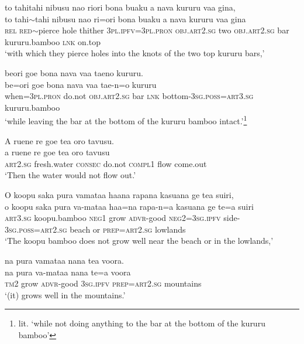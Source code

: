 \ea\label{ex:text6-27}
to tahitahi nibusu nao riori bona buaku a nava kururu vaa gina,\\
\gll to	tahi{$\sim$}tahi	nibusu	nao	ri=ori	bona	buaku	a	nava	kururu	vaa	gina\\
     \textsc{rel}	\textsc{red}{$\sim$}pierce	hole	thither	3\textsc{pl}.\textsc{ipfv}=3\textsc{pl}.\textsc{pron}	\textsc{obj}.\textsc{art}2.\textsc{sg}	two	\textsc{obj}.\textsc{art}2.\textsc{sg}	bar	kururu.bamboo	\textsc{lnk}	on.top\\
\glt `with which they pierce holes into the knots of the two top kururu bars,'
\z

\ea\label{ex:text6-28}
beori goe bona nava vaa taeno kururu.\\
\gll be=ori	goe	bona	nava	vaa	tae-n=o	kururu\\
     when=3\textsc{pl}.\textsc{pron}	do.not	\textsc{obj}.\textsc{art}2.\textsc{sg}	bar	\textsc{lnk}	bottom-3\textsc{sg}.\textsc{poss}=\textsc{art}3.\textsc{sg}	kururu.bamboo\\
\glt `while leaving the bar at the bottom of the kururu bamboo intact.'\footnote{lit. `while not doing anything to the bar at the bottom of the kururu bamboo'}
\z

\ea\label{ex:text6-29}
A ruene re goe tea oro tavusu.\\
\gll a	ruene	re	goe	tea	oro	tavusu\\
     \textsc{art}2.\textsc{sg}	fresh.water	\textsc{consec}	do.not	\textsc{compl}1	flow	come.out\\
\glt `Then the water would not flow out.'
\z

\ea\label{ex:text6-30}
O koopu saka pura vamataa haana rapana kasuana ge tea suiri,\\
\gll o	koopu	saka	pura	va-mataa	haa=na	rapa-n=a	kasuana	ge	te=a	suiri\\
     \textsc{art}3.\textsc{sg}	koopu.bamboo	\textsc{neg}1	grow	\textsc{advr}-good	\textsc{neg}2=3\textsc{sg}.\textsc{ipfv}	side-3\textsc{sg}.\textsc{poss}=\textsc{art}2.\textsc{sg}	beach	or	\textsc{prep}=\textsc{art}2.\textsc{sg}	lowlands\\
\glt `The koopu bamboo does not grow well near the beach or in the lowlands,'
\z

\ea\label{ex:text6-31}
na pura vamataa nana tea voora.\\
\gll na	pura	va-mataa	nana	te=a	voora\\
     \textsc{tm}2	grow	\textsc{advr}-good	3\textsc{sg}.\textsc{ipfv}	\textsc{prep}=\textsc{art}2.\textsc{sg}	mountains\\
\glt `(it) grows well in the mountains.'
\z

